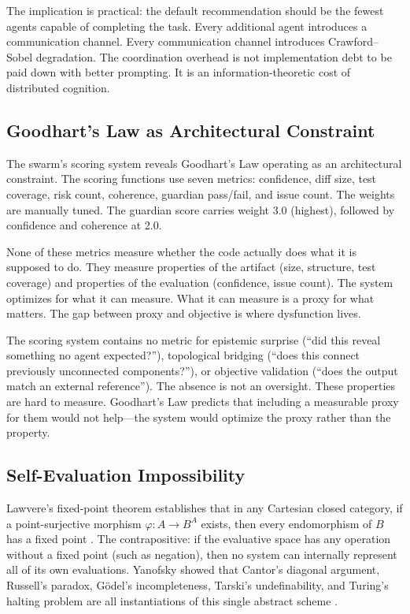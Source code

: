\documentclass[11pt,a4paper]{article}
\begin{document}
The implication is practical: the default recommendation should be the fewest agents capable of completing the task. Every additional agent introduces a communication channel. Every communication channel introduces Crawford--Sobel degradation. The coordination overhead is not implementation debt to be paid down with better prompting. It is an information-theoretic cost of distributed cognition.

\subsection{Goodhart's Law as Architectural Constraint}

The swarm's scoring system reveals Goodhart's Law operating as an architectural constraint. The scoring functions use seven metrics: confidence, diff size, test coverage, risk count, coherence, guardian pass/fail, and issue count. The weights are manually tuned. The guardian score carries weight 3.0 (highest), followed by confidence and coherence at 2.0.

None of these metrics measure whether the code actually does what it is supposed to do. They measure properties of the artifact (size, structure, test coverage) and properties of the evaluation (confidence, issue count). The system optimizes for what it can measure. What it can measure is a proxy for what matters. The gap between proxy and objective is where dysfunction lives.

The scoring system contains no metric for epistemic surprise (``did this reveal something no agent expected?''), topological bridging (``does this connect previously unconnected components?''), or objective validation (``does the output match an external reference''). The absence is not an oversight. These properties are hard to measure. Goodhart's Law predicts that including a measurable proxy for them would not help---the system would optimize the proxy rather than the property.

\subsection{Self-Evaluation Impossibility}

Lawvere's fixed-point theorem establishes that in any Cartesian closed category, if a point-surjective morphism $\varphi: A \to B^A$ exists, then every endomorphism of $B$ has a fixed point \citep{lawvere1969}. The contrapositive: if the evaluative space has any operation without a fixed point (such as negation), then no system can internally represent all of its own evaluations. Yanofsky showed that Cantor's diagonal argument, Russell's paradox, G\"{o}del's incompleteness, Tarski's undefinability, and Turing's halting problem are all instantiations of this single abstract scheme \citep{yanofsky2003}.
\end{document}
